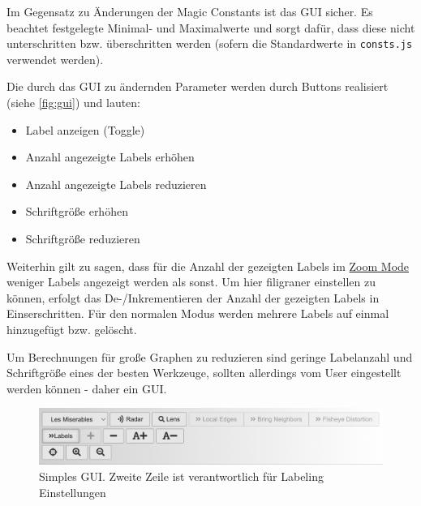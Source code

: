 
Im Gegensatz zu Änderungen der Magic Constants ist das GUI sicher. Es beachtet festgelegte Minimal- und Maximalwerte
und sorgt dafür, dass diese nicht unterschritten bzw. überschritten werden (sofern die Standardwerte in \texttt{consts.js} verwendet werden).

Die durch das GUI zu ändernden Parameter werden durch Buttons realisiert (siehe \autoref{fig:gui}) und lauten:
\begin{itemize}
    \item Label anzeigen (Toggle)
    \item Anzahl angezeigte Labels erhöhen
    \item Anzahl angezeigte Labels reduzieren
    \item Schriftgröße erhöhen
    \item Schriftgröße reduzieren
\end{itemize}

Weiterhin gilt zu sagen, dass für die Anzahl der gezeigten Labels im \hyperref[subsec:zoom]{Zoom Mode} weniger Labels angezeigt werden als sonst.
Um hier filigraner einstellen zu können, erfolgt das De-/Inkrementieren der Anzahl der gezeigten Labels in Einserschritten.
Für den normalen Modus werden mehrere Labels auf einmal hinzugefügt bzw. gelöscht.

Um Berechnungen für große Graphen zu reduzieren sind geringe Labelanzahl und Schriftgröße eines der besten Werkzeuge, sollten allerdings vom User eingestellt werden können - daher ein GUI.

\begin{figure}[H]
    \centering
    \includegraphics[width=\linewidth]{../img/gui}
    \caption{Simples GUI. Zweite Zeile ist verantwortlich für Labeling Einstellungen}
    \label{fig:gui}
\end{figure}
